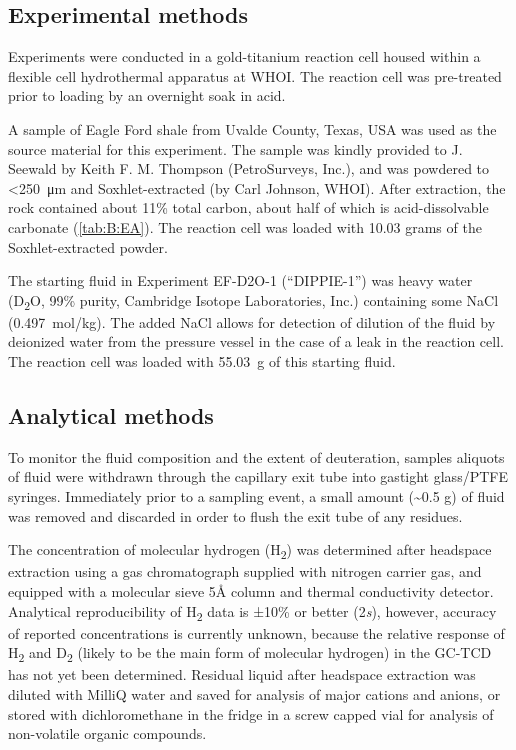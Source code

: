 \subsection{Experimental methods}\label{experimental-methods}

Experiments were conducted in a gold-titanium reaction cell housed
within a flexible cell hydrothermal apparatus \parencite{Seyfried++_1987} at
WHOI. The reaction cell was pre-treated prior to loading by an overnight
soak in acid.

A sample of Eagle Ford shale from Uvalde County, Texas, USA was used as the source material for this
experiment. The sample was kindly provided to J. Seewald by Keith F. M. Thompson (PetroSurveys, Inc.), and
was powdered to \textless{}\SI{250}{\micro\meter} and Soxhlet-extracted (by Carl Johnson, WHOI).  After extraction, the rock contained about 11\% total carbon, about half of which is acid-dissolvable carbonate (\autoref{tab:B:EA}). The reaction cell was loaded with 10.03 grams of the Soxhlet-extracted powder.  

The starting fluid in Experiment EF-D2O-1 (``DIPPIE-1'') was heavy water
(D\textsubscript{2}O, 99\% purity, Cambridge Isotope Laboratories, Inc.) containing some NaCl (0.497~mol/kg). The added NaCl allows for detection of dilution of the fluid by deionized water from
the pressure vessel in the case of a leak in the reaction cell. The reaction cell was loaded with 55.03~g of this starting fluid.



\subsection{Analytical methods}\label{analytical-methods}

To monitor the fluid composition and the extent of deuteration, samples
aliquots of fluid were withdrawn through the capillary exit tube into
gastight glass/PTFE syringes. Immediately prior to a sampling event, a
small amount (\textasciitilde{}0.5 g) of fluid was removed and discarded
in order to flush the exit tube of any residues.

The concentration of molecular hydrogen (H\textsubscript{2}) was
determined after headspace extraction using a gas chromatograph supplied
with nitrogen carrier gas, and equipped with a molecular sieve 5Å column
and thermal conductivity detector. Analytical reproducibility of
H\textsubscript{2} data is ±10\% or better (2\emph{s}), however,
accuracy of reported concentrations is currently unknown, because the
relative response of H\textsubscript{2} and D\textsubscript{2} (likely
to be the main form of molecular hydrogen) in the GC-TCD has not yet
been determined. Residual liquid after headspace extraction was diluted
with MilliQ water and saved for analysis of major cations and anions, or
stored with dichloromethane in the fridge in a screw capped vial for
analysis of non-volatile organic compounds.

